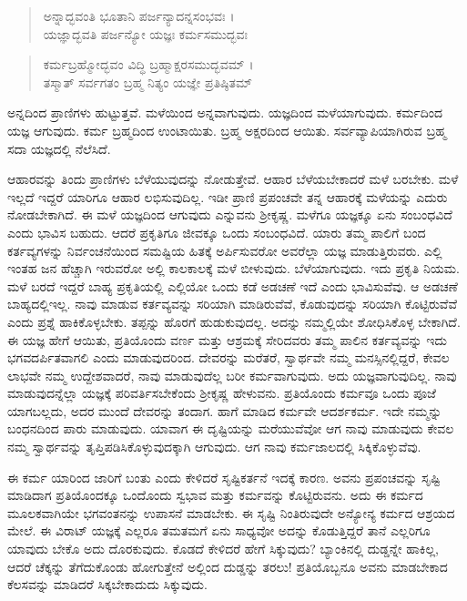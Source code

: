 \begin{verse}
ಅನ್ನಾದ್ಭವಂತಿ ಭೂತಾನಿ ಪರ್ಜನ್ಯಾದನ್ನಸಂಭವಃ ।\\ಯಜ್ಞಾದ್ಭವತಿ ಪರ್ಜನ್ಯೋ ಯಜ್ಞಃ ಕರ್ಮಸಮುದ್ಭವಃ 
\end{verse}

\begin{verse}
ಕರ್ಮಬ್ರಹ್ಮೋದ್ಭವಂ ವಿದ್ಧಿ ಬ್ರಹ್ಮಾಕ್ಷರಸಮುದ್ಭವಮ್ ।\\ತಸ್ಮಾತ್ ಸರ್ವಗತಂ ಬ್ರಹ್ಮ ನಿತ್ಯಂ ಯಜ್ಞೇ ಪ್ರತಿಷ್ಠಿತಮ್ 
\end{verse}

{\small ಅನ್ನದಿಂದ ಪ್ರಾಣಿಗಳು ಹುಟ್ಟುತ್ತವೆ. ಮಳೆಯಿಂದ ಅನ್ನವಾಗುವುದು. ಯಜ್ಞದಿಂದ ಮಳೆಯಾಗುವುದು. ಕರ್ಮದಿಂದ ಯಜ್ಞ ಆಗುವುದು. ಕರ್ಮ ಬ್ರಹ್ಮದಿಂದ ಉಂಟಾಯಿತು. ಬ್ರಹ್ಮ ಅಕ್ಷರದಿಂದ ಆಯಿತು. ಸರ್ವವ್ಯಾಪಿಯಾಗಿರುವ ಬ್ರಹ್ಮ ಸದಾ ಯಜ್ಞದಲ್ಲಿ ನೆಲೆಸಿದೆ.}

ಆಹಾರವನ್ನು ತಿಂದು ಪ್ರಾಣಿಗಳು ಬೆಳೆಯುವುದನ್ನು ನೋಡುತ್ತೇವೆ. ಆಹಾರ ಬೆಳೆಯಬೇಕಾದರೆ ಮಳೆ ಬರಬೇಕು. ಮಳೆ ಇಲ್ಲದೆ ಇದ್ದರೆ ಯಾರಿಗೂ ಆಹಾರ ಲಭಿಸುವುದಿಲ್ಲ. ಇಡೀ ಪ್ರಾಣಿ ಪ್ರಪಂಚವೇ ತನ್ನ ಆಹಾರಕ್ಕೆ ಮಳೆಯನ್ನು ಎದುರು ನೋಡಬೇಕಾಗಿದೆ. ಈ ಮಳೆ ಯಜ್ಞದಿಂದ ಆಗುವುದು ಎನ್ನುವನು ಶ್ರೀಕೃಷ್ಣ. ಮಳೆಗೂ ಯಜ್ಞಕ್ಕೂ ಏನು ಸಂಬಂಧವಿದೆ ಎಂದು ಭಾವಿಸ ಬಹುದು. ಆದರೆ ಪ್ರಕೃತಿಗೂ ಜೀವಕ್ಕೂ ಒಂದು ಸಂಬಂಧವಿದೆ. ಯಾರು ತಮ್ಮ ಪಾಲಿಗೆ ಬಂದ ಕರ್ತವ್ಯಗಳನ್ನು ನಿರ್ವಂಚನೆಯಿಂದ ಸಮಷ್ಟಿಯ ಹಿತಕ್ಕೆ ಅರ್ಪಿಸುವರೋ ಅವರೆಲ್ಲಾ ಯಜ್ಞ ಮಾಡುತ್ತಿರುವರು. ಎಲ್ಲಿ ಇಂತಹ ಜನ ಹೆಚ್ಚಾಗಿ ಇರುವರೋ ಅಲ್ಲಿ ಕಾಲಕಾಲಕ್ಕೆ ಮಳೆ ಬೀಳುವುದು. ಬೆಳೆಯಾಗುವುದು. ಇದು ಪ್ರಕೃತಿ ನಿಯಮ. ಮಳೆ ಬರದೆ ಇದ್ದರೆ ಬಾಹ್ಯ ಪ್ರಕೃತಿಯಲ್ಲಿ ಎಲ್ಲಿಯೋ ಒಂದು ಕಡೆ ಅಡಚಣೆ ಇದೆ ಎಂದು ಭಾವಿಸುವೆವು. ಆ ಅಡಚಣೆ ಬಾಹ್ಯದಲ್ಲಿಇಲ್ಲ. ನಾವು ಮಾಡುವ ಕರ್ತವ್ಯವನ್ನು ಸರಿಯಾಗಿ ಮಾಡಿರುವೆವೆ, ಕೊಡುವುದನ್ನು ಸರಿಯಾಗಿ ಕೊಟ್ಟಿರುವೆವೆ ಎಂದು ಪ್ರಶ್ನೆ ಹಾಕಿಕೊಳ್ಳಬೇಕು. ತಪ್ಪನ್ನು ಹೊರಗೆ ಹುಡುಕುವುದಲ್ಲ. ಅದನ್ನು ನಮ್ಮಲ್ಲಿಯೇ ಶೋಧಿಸಿಕೊಳ್ಳ ಬೇಕಾಗಿದೆ. ಈ ಯಜ್ಞ ಹೇಗೆ ಆಯಿತು, ಪ್ರತಿಯೊಂದು ವರ್ಣ ಮತ್ತು ಆಶ್ರಮಕ್ಕೆ ಸೇರಿದವರು ತಮ್ಮ ಪಾಲಿನ ಕರ್ತವ್ಯವನ್ನು ಇದು ಭಗವದರ್ಪಿತವಾಗಲಿ ಎಂದು ಮಾಡುವುದರಿಂದ. ದೇವರನ್ನು ಮರೆತರೆ, ಸ್ವಾರ್ಥವೇ ನಮ್ಮ ಮನಸ್ಸಿನಲ್ಲಿದ್ದರೆ, ಕೇವಲ ಲಾಭವೇ ನಮ್ಮ ಉದ್ದೇಶವಾದರೆ, ನಾವು ಮಾಡುವುದೆಲ್ಲ ಬರೀ ಕರ್ಮವಾಗುವುದು. ಅದು ಯಜ್ಞವಾಗುವುದಿಲ್ಲ. ನಾವು ಮಾಡುವುದನ್ನೆಲ್ಲಾ ಯಜ್ಞಕ್ಕೆ ಪರಿವರ್ತಿಸಬೇಕೆಂದು ಶ್ರೀಕೃಷ್ಣ ಹೇಳುವನು. ಪ್ರತಿಯೊಂದು ಕರ್ಮವೂ ಒಂದು ಪೂಜೆ ಯಾಗಬಲ್ಲದು, ಅದರ ಮುಂದೆ ದೇವರನ್ನು ತಂದಾಗ. ಹಾಗೆ ಮಾಡಿದ ಕರ್ಮವೇ ಆದರ್ಶಕರ್ಮ. ಇದೇ ನಮ್ಮನ್ನು ಬಂಧನದಿಂದ ಪಾರು ಮಾಡುವುದು. ಯಾವಾಗ ಈ ದೃಷ್ಟಿಯನ್ನು ಮರೆಯುವೆವೋ ಆಗ ನಾವು ಮಾಡುವುದು ಕೇವಲ ನಮ್ಮ ಸ್ವಾರ್ಥವನ್ನು ತೃಪ್ತಿಪಡಿಸಿಕೊಳ್ಳುವುದಕ್ಕಾಗಿ ಆಗುವುದು. ಆಗ ನಾವು ಕರ್ಮಜಾಲದಲ್ಲಿ ಸಿಕ್ಕಿಕೊಳ್ಳುವೆವು.

ಈ ಕರ್ಮ ಯಾರಿಂದ ಜಾರಿಗೆ ಬಂತು ಎಂದು ಕೇಳಿದರೆ ಸೃಷ್ಟಿಕರ್ತನೆ ಇದಕ್ಕೆ ಕಾರಣ. ಅವನು ಪ್ರಪಂಚವನ್ನು ಸೃಷ್ಟಿ ಮಾಡಿದಾಗ ಪ್ರತಿಯೊಂದಕ್ಕೂ ಒಂದೊಂದು ಸ್ವಭಾವ ಮತ್ತು ಕರ್ಮವನ್ನು ಕೊಟ್ಟಿರುವನು. ಅದು ಈ ಕರ್ಮದ ಮೂಲಕವಾಗಿಯೇ ಭಗವಂತನನ್ನು ಉಪಾಸನೆ ಮಾಡಬೇಕು. ಈ ಸೃಷ್ಟಿ ನಿಂತಿರುವುದೇ ಅನ್ಯೋನ್ಯ ಕರ್ಮದ ಆಶ್ರಯದ ಮೇಲೆ. ಈ ವಿರಾಟ್ ಯಜ್ಞಕ್ಕೆ ಎಲ್ಲರೂ ತಮತಮಗೆ ಏನು ಸಾಧ್ಯವೋ ಅದನ್ನು ಕೊಡುತ್ತಿದ್ದರೆ ತಾನೆ ಎಲ್ಲರಿಗೂ ಯಾವುದು ಬೇಕೊ ಅದು ದೊರಕುವುದು. ಕೊಡದೆ ಕೇಳಿದರೆ ಹೇಗೆ ಸಿಕ್ಕುವುದು? ಬ್ಯಾಂಕಿನಲ್ಲಿ ದುಡ್ಡನ್ನೇ ಹಾಕಿಲ್ಲ, ಆದರೆ ಚೆಕ್ಕನ್ನು ತೆಗೆದುಕೊಂಡು ಹೋಗುತ್ತೇನೆ ಅಲ್ಲಿಂದ ದುಡ್ಡನ್ನು ತರಲು! ಪ್ರತಿಯೊಬ್ಬನೂ ಅವನು ಮಾಡಬೇಕಾದ ಕೆಲಸವನ್ನು ಮಾಡಿದರೆ ಸಿಕ್ಕಬೇಕಾದುದು ಸಿಕ್ಕುವುದು.

